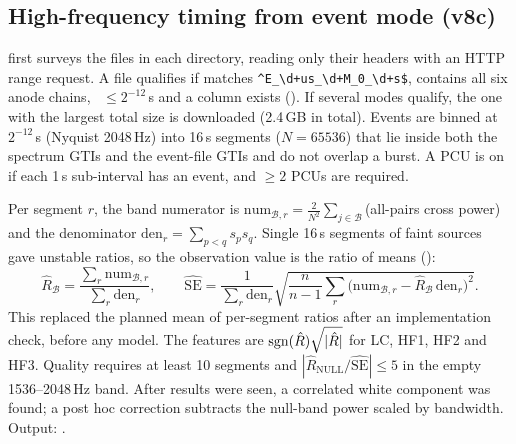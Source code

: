 \subsection{High-frequency timing from event mode (v8c)}\label{sec:eventmode}
 first surveys the  files in each  directory, reading only their headers
with an HTTP range request. A file qualifies if  matches \verb|^E_\d+us_\d+M_0_\d+s$|,  contains
all six anode chains, ~$\le2^{-12}$\,s and a  column exists (). If
several modes qualify, the one with the largest total size is downloaded (2.4\,GB in total). Events are binned at
$2^{-12}$\,s (Nyquist 2048\,Hz) into 16\,s segments ($N=65536$) that lie inside both the spectrum GTIs and the event-file GTIs
and do not overlap a burst. A PCU is on if each 1\,s sub-interval has an event, and $\ge2$ PCUs are required.

Per segment $r$, the band numerator is $\mathrm{num}_{\mathcal B,r}=\frac{2}{N^2}\sum_{j\in\mathcal B}$(all-pairs cross
power) and the denominator $\mathrm{den}_r=\sum_{p<q}s_ps_q$. Single 16\,s segments of faint sources gave unstable ratios,
so the observation value is the ratio of means ():
\begin{equation}
\hat R_\mathcal B=\frac{\sum_r\mathrm{num}_{\mathcal B,r}}{\sum_r\mathrm{den}_r},\qquad
\widehat{\mathrm{SE}}=\frac{1}{\sum_r\mathrm{den}_r}\sqrt{\frac{n}{n-1}\sum_r\bigl(\mathrm{num}_{\mathcal B,r}-\hat R_\mathcal B\,\mathrm{den}_r\bigr)^2}.\label{eq:ratioofmeans}
\end{equation}
This replaced the planned mean of per-segment ratios after an implementation check, before any model. The features are
$\operatorname{sgn}(\hat R)\sqrt{|\hat R|}$ for LC, HF1, HF2 and HF3. Quality requires at least 10 segments and
$|\hat R_\mathrm{NULL}/\widehat{\mathrm{SE}}|\le5$ in the empty 1536--2048\,Hz band. After results were seen, a correlated
white component was found; a post hoc correction subtracts the null-band power scaled by bandwidth. Output:
.

